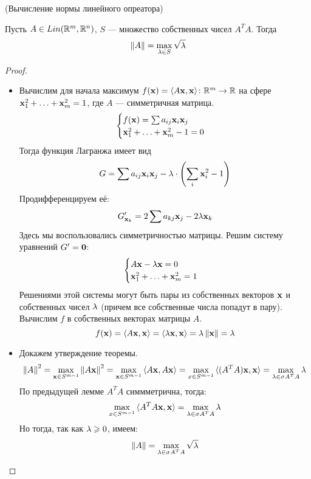 \begin{theorem}(Вычисление нормы линейного опреатора)

    Пусть $A \in Lin(\mathbb{R}^m, \mathbb{R}^n)$, $S$ --- множество собственных чисел $A^T A$.
    Тогда
\[
    \left\lVert A\right\rVert = \max_{\lambda \in S}{\sqrt{\lambda}}
\]
\end{theorem}
\begin{proof}
    \enewline

    \begin{itemize}
    \item
    Вычислим для начала максимум $f(\mathbf{x}) = \langle A\mathbf{x}, \mathbf{x}\rangle \colon \mathbb{R}^m \to \mathbb{R}$ на сфере
    $\mathbf{x}_1^2 + \ldots + \mathbf{x}_m^2 = 1$, где $A$ --- симметричная матрица.
\[
    \begin{cases}
        f(\mathbf{x}) = \sum{a_{ij} \mathbf{x}_i \mathbf{x}_j} \\
        \mathbf{x}_1^2 + \ldots + \mathbf{x}_m^2 - 1 = 0
    \end{cases}
\]
    Тогда функция Лагранжа имеет вид
\[
    G = \sum{a_{ij} \mathbf{x}_i \mathbf{x}_j} - \lambda \cdot \left( \sum_{i}{\mathbf{x}_i^2} - 1 \right)
\]
    Продифференцируем её:
\[
    G'_{\mathbf{x}_k} = 2 \sum{a_{kj} \mathbf{x}_j} - 2 \lambda \mathbf{x}_k
\]
    Здесь мы воспользовались симметричностью матрицы. Решим систему уравнений
    $G' = \mathbf{0}$:
\[
    \begin{cases}
        A \mathbf{x} - \lambda \mathbf{x} = 0 \\
        \mathbf{x}_1^2 + \ldots + \mathbf{x}_m^2 = 1
    \end{cases}
\]
    Решениями этой системы могут быть пары из собственных векторов $\mathbf{x}$
    и собственных чисел $\lambda$ (причем все собственные числа попадут в пару).
    Вычислим $f$ в собственных векторах матрицы $A$.
\[
    f(\mathbf{x}) = \langle A \mathbf{x}, \mathbf{x}\rangle = \langle\lambda \mathbf{x}, \mathbf{x}\rangle = \lambda \left\lVert\mathbf{x}\right\rVert = \lambda
\]
    \item Докажем утверждение теоремы.
\[
    \left\lVert A\right\rVert^2 = \max_{\mathbf{x} \in S^{m - 1}}{\left\lVert A \mathbf{x}\right\rVert^2}
    = \max_{\mathbf{x} \in S^{m - 1}}{\langle A \mathbf{x}, A \mathbf{x}\rangle} = \max_{x \in S^{m - 1}}
    {\langle(A^T A) \mathbf{x}, \mathbf{x}\rangle} = \max_{\lambda \in \sigma{A^T A}}{\lambda}
\]
    По предыдущей лемме $A^T A$ симмметрична, тогда:
\[
    \max_{x \in S^{m - 1}} {\langle A^T A \mathbf{x}, \mathbf{x}\rangle} = \max_{\lambda \in \sigma{A^T A}}{\lambda}
\]
    Но тогда, так как $\lambda \geqslant 0$, имеем:
\[
    \left\lVert A\right\rVert = \max_{\lambda \in \sigma{A^T A}}{\sqrt{\lambda}}
\]
    \end{itemize}
\end{proof}

